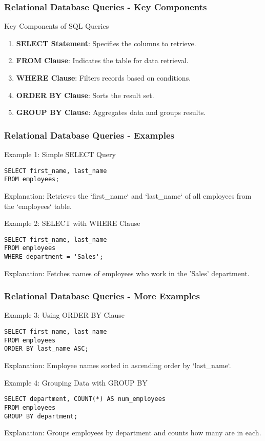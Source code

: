 \documentclass[aspectratio=169]{beamer}
\begin{document}
\begin{frame}[fragile]
    \frametitle{Relational Database Queries - Key Components}
    \begin{block}{Key Components of SQL Queries}
        \begin{enumerate}
            \item \textbf{SELECT Statement}: Specifies the columns to retrieve.
            \item \textbf{FROM Clause}: Indicates the table for data retrieval.
            \item \textbf{WHERE Clause}: Filters records based on conditions.
            \item \textbf{ORDER BY Clause}: Sorts the result set.
            \item \textbf{GROUP BY Clause}: Aggregates data and groups results.
        \end{enumerate}
    \end{block}
\end{frame}

\begin{frame}[fragile]
    \frametitle{Relational Database Queries - Examples}
    \begin{block}{Example 1: Simple SELECT Query}
        \begin{lstlisting}
SELECT first_name, last_name
FROM employees;
        \end{lstlisting}
        Explanation: Retrieves the `first_name` and `last_name` of all employees from the `employees` table.
    \end{block}

    \begin{block}{Example 2: SELECT with WHERE Clause}
        \begin{lstlisting}
SELECT first_name, last_name
FROM employees
WHERE department = 'Sales';
        \end{lstlisting}
        Explanation: Fetches names of employees who work in the 'Sales' department.
    \end{block}
\end{frame}

\begin{frame}[fragile]
    \frametitle{Relational Database Queries - More Examples}
    \begin{block}{Example 3: Using ORDER BY Clause}
        \begin{lstlisting}
SELECT first_name, last_name
FROM employees
ORDER BY last_name ASC;
        \end{lstlisting}
        Explanation: Employee names sorted in ascending order by `last_name`.
    \end{block}

    \begin{block}{Example 4: Grouping Data with GROUP BY}
        \begin{lstlisting}
SELECT department, COUNT(*) AS num_employees
FROM employees
GROUP BY department;
        \end{lstlisting}
        Explanation: Groups employees by department and counts how many are in each.
    \end{block}
\end{frame}
\end{document}
